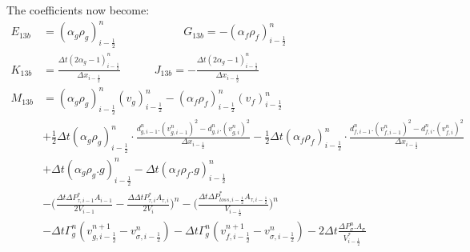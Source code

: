 \documentclass[11pt,letterpaper,titlepage]{article}
\newcommand{\half}{\frac{1}{2}}
\begin{document}
\vspace{0.5in}

The coefficients now become:
\begin{equation*}
\begin{aligned}
  E_{13b} &=  (\alpha_g\rho_g )_{i-\half}^n \quad \quad \quad \quad \quad \quad 
  G_{13b}  = -(\alpha_f\rho_f )_{i-\half}^n \\
  K_{13b} &=  \frac{\Delta t(2\alpha_g-1)_{i-\half}^n}{\Delta x_{i-\half}} \quad \quad \quad 
  J_{13b}  = -\frac{\Delta t(2\alpha_g-1)_{i-\half}^n}{\Delta x_{i-\half}}\\
  M_{13b} &= (\alpha_g\rho_g )_{i-\half}^n(v_g)^{n}_{i-\half}
  -(\alpha_f\rho_f )_{i-\half}^n(v_f)^{n}_{i-\half}\\
  &+\half \Delta t (\alpha_g \rho_{g})_{i-\half}^n \cdot\frac{d_{g,i-1}^n.(v_{g,i-1}^n)^2-d_{g,i}^n.(v_{g,i}^n)^2}{\Delta x_{i-\half}} 
  -\half \Delta t (\alpha_f \rho_{f})_{i-\half}^n \cdot\frac{d_{f,i-1}^n.(v_{f,i-1}^n)^2-d_{f,i}^n.(v_{f,i}^n)^2}{\Delta x_{i-\half}} \\
  &+  \Delta t(\alpha_g \rho_{g}.g)_{i-\half}^n 
  -  \Delta t(\alpha_f \rho_{f}.g)_{i-\half}^n  \\
  &-\biggr(\frac{ \Delta t\Delta P_{\tau,i-1}^*A_{i-1}}{2V_{i-1}}-\frac{\Delta  \Delta tP_{\tau,i}^*A_{\tau,i}}{2V_{i}}\biggr)^n 
  -\biggr(\frac{ \Delta t\Delta P_{loss,i-\half}^*A_{\tau,i-\half}}{V_{i-\half}}\biggr)^n\\
  & -  \Delta t\Gamma_g^n (v_{g,i-\half}^{n+1} - v_{\sigma,i-\half}^n)
  - \Delta t \Gamma_g^n (v_{f,i-\half}^{n+1} - v_{\sigma,i-\half}^n)-2 \Delta t\frac{\Delta P_{\sigma}^n.A_{\sigma}}{V_{i-\half}^*}
\end{aligned}
\end{equation*}
\end{document}
